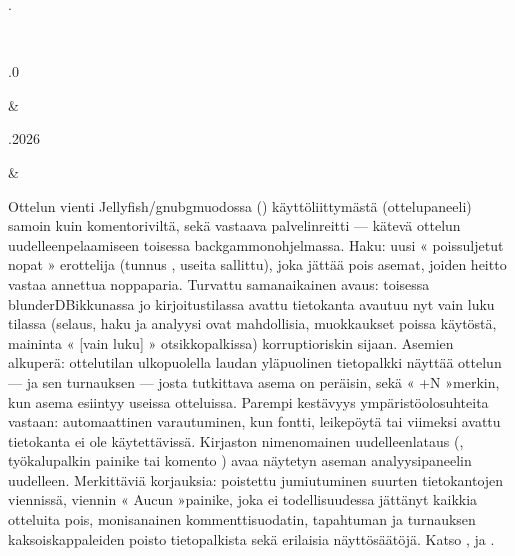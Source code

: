\documentclass[letterpaper,10pt,finnish]{sphinxmanual}
\begin{document}
\begin{savenotes}
\begin{longtable}{}
\begin{varwidth}[t]{}
{\hyperref[\detokenize{telecharge_install:telecharge-install}]{}}.
\sphinxbeforeendvarwidth
\end{varwidth}%
\\
\sphinxhline\begin{varwidth}[t]{}
.0
\sphinxbeforeendvarwidth
\end{varwidth}%
&\begin{varwidth}[t]{}
.2026
\sphinxbeforeendvarwidth
\end{varwidth}%
&\begin{varwidth}[t]{}
\sphinxAtStartPar
Ottelun vienti Jellyfish/gnubg\sphinxhyphen{}muodossa () käyttöliittymästä (ottelupaneeli) samoin kuin komentoriviltä, sekä vastaava palvelinreitti — kätevä ottelun uudelleenpelaamiseen toisessa backgammon\sphinxhyphen{}ohjelmassa. Haku: uusi « poissuljetut nopat » \sphinxhyphen{}erottelija (tunnus , useita sallittu), joka jättää pois asemat, joiden heitto vastaa annettua noppaparia. Turvattu samanaikainen avaus: toisessa blunderDB\sphinxhyphen{}ikkunassa jo kirjoitustilassa avattu tietokanta avautuu nyt vain luku \sphinxhyphen{}tilassa (selaus, haku ja analyysi ovat mahdollisia, muokkaukset poissa käytöstä, maininta « {[}vain luku{]} » otsikkopalkissa) korruptioriskin sijaan. Asemien alkuperä: ottelutilan ulkopuolella laudan yläpuolinen tietopalkki näyttää ottelun — ja sen turnauksen — josta tutkittava asema on peräisin, sekä « +N »\sphinxhyphen{}merkin, kun asema esiintyy useissa otteluissa. Parempi kestävyys ympäristöolosuhteita vastaan: automaattinen varautuminen, kun fontti, leikepöytä tai viimeksi avattu tietokanta ei ole käytettävissä. Kirjaston nimenomainen uudelleenlataus (, työkalupalkin painike tai komento ) avaa näytetyn aseman analyysipaneelin uudelleen. Merkittäviä korjauksia: poistettu jumiutuminen suurten tietokantojen viennissä, viennin « Aucun »\sphinxhyphen{}painike, joka ei todellisuudessa jättänyt kaikkia otteluita pois, monisanainen kommenttisuodatin, tapahtuman ja turnauksen kaksoiskappaleiden poisto tietopalkista sekä erilaisia näyttösäätöjä. Katso {\hyperref[\detokenize{cmd_mode:cmd-mode}]{}}, {\hyperref[\detokenize{manuel:panneau-matchs}]{}} ja {\hyperref[\detokenize{manuel:manuel}]{}}.

\end{varwidth}
\end{longtable}
\end{savenotes}
\end{document}
